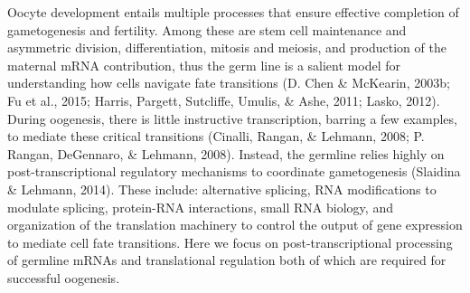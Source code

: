 \documentclass[12pt,oneside]{reedthesis}
\begin{document}
Oocyte development entails multiple processes that ensure effective
completion of gametogenesis and fertility. Among these are stem cell
maintenance and asymmetric division, differentiation, mitosis and
meiosis, and production of the maternal mRNA contribution, thus the germ
line is a salient model for understanding how cells navigate fate
transitions (D. Chen \& McKearin, 2003b; Fu et al., 2015; Harris, Pargett, Sutcliffe, Umulis, \& Ashe, 2011; Lasko, 2012).
During oogenesis, there is little instructive transcription, barring a
few examples, to mediate these critical transitions (Cinalli, Rangan, \& Lehmann, 2008; P. Rangan, DeGennaro, \& Lehmann, 2008). Instead, the germline relies highly on
post-transcriptional regulatory mechanisms to coordinate gametogenesis
(Slaidina \& Lehmann, 2014). These include: alternative splicing, RNA
modifications to modulate splicing, protein-RNA interactions, small RNA
biology, and organization of the translation machinery to control the
output of gene expression to mediate cell fate transitions. Here we
focus on post-transcriptional processing of germline mRNAs and
translational regulation both of which are required for successful
oogenesis.
\end{document}

